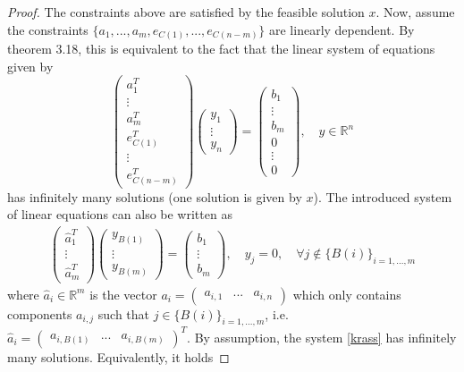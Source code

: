 \documentclass[12pt,letterpaper]{article}
\begin{document}
\begin{proof}
    The constraints above are satisfied by the feasible solution $x$. Now, assume the constraints $\{ a_1,...,a_m, e_{C(1)}, ..., e_{C(n-m)} \}$ are linearly dependent. By theorem 3.18, this is equivalent to the fact that the linear system of equations given by 
    \[
        \begin{pmatrix}
            a_1^T \\
            \vdots \\
            a_m^T \\
            e_{C(1)}^T \\
            \vdots \\
            e_{C(n-m)}^T
        \end{pmatrix} 
        \begin{pmatrix}
            y_1 \\ \vdots \\ y_n
        \end{pmatrix}
        = \begin{pmatrix}
            b_1 \\ \vdots \\ b_m \\ 0 \\ \vdots \\ 0
        \end{pmatrix}, \quad y \in \mathbb R^n
    \]
    has infinitely many solutions (one solution is given by $x$). The introduced system of linear equations can also be written as
    \begin{align}\label{krass}
        \begin{pmatrix}
            \hat a_1^T \\
            \vdots \\
            \hat a_m^T
        \end{pmatrix} \begin{pmatrix}
            y_{B(1)} \\ \vdots \\ y_{B(m)}
        \end{pmatrix} = \begin{pmatrix}
            b_1 \\ \vdots \\ b_m
        \end{pmatrix}, \quad y_j = 0, \quad \forall j \notin \{B(i)\}_{i=1,...,m} \tag{*}
    \end{align}
    where $\hat a_i \in \mathbb R^m$ is the vector $a_i = \begin{pmatrix} a_{i,1} & ... & a_{i,n} \end{pmatrix}$ which only contains components $a_{i,j}$ such that $j \in \{B(i)\}_{i=1,...,m}$, i.e. $\hat a_i = \begin{pmatrix} a_{i,B(1)} & ... & a_{i,B(m)} \end{pmatrix}^T$. By assumption, the system \eqref{krass} has infinitely many solutions. Equivalently, it holds 

\end{proof}
\end{document}

